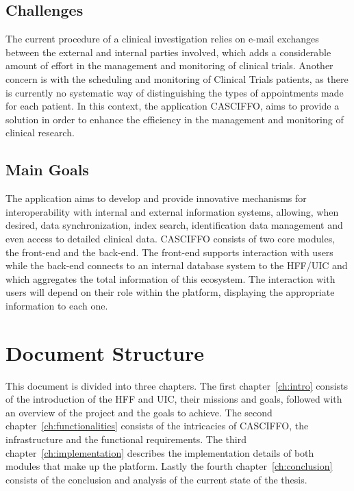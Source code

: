 \subsection{Challenges}
The current procedure of a clinical investigation relies on e-mail exchanges between the external and internal parties involved, which adds a considerable amount of effort in the management and monitoring of clinical trials. Another concern is with the scheduling and monitoring of Clinical Trials patients, as there is currently no systematic way of distinguishing the types of appointments made for each patient.  
In this context, the application CASCIFFO, aims to provide a solution in order to enhance the efficiency in the management and monitoring of clinical research.

\subsection{Main Goals}
The application aims to develop and provide innovative mechanisms for interoperability with internal and external information systems, allowing, when desired, data synchronization, index search, identification data management and even access to detailed clinical data. 
CASCIFFO consists of two core modules, the front-end and the back-end. The front-end supports interaction with users while the back-end connects to an internal database system to the HFF/UIC and which aggregates the total information of this ecosystem.  
The interaction with users will depend on their role within the platform, displaying the appropriate information to each one. 


\section{Document Structure}
This document is divided into three chapters. The first chapter~\ref{ch:intro} consists of the introduction of the HFF and UIC, their missions and goals, followed with an overview of the project and the goals to achieve. The second chapter~\ref{ch:functionalities} consists of the intricacies of CASCIFFO, the infrastructure and the functional requirements. The third chapter~\ref{ch:implementation} describes the implementation details of both modules that make up the platform. Lastly the fourth chapter~\ref{ch:conclusion} consists of the conclusion and analysis of the current state of the thesis.  
